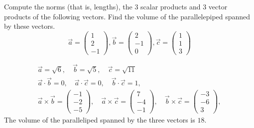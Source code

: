 \documentclass[11pt]{article}
\begin{document}


\begin{exercise}
	Compute the norms (that is, lengths), the $3$ scalar products and $3$ vector products of the following vectors. 
    Find the volume of the parallelepiped spanned by these vectors.
    \[
    \vec{a} = \left(\begin{array}{c} 1 \\ 2 \\ -1 \end{array}\right)
    ,
    \vec{b} = \left(\begin{array}{c} 2 \\ -1 \\ 0 \end{array}\right)
    ,
    \vec{c} = \left(\begin{array}{c} 1 \\ 1 \\ 3 \end{array}\right)
    \]
\end{exercise}

\begin{solution}
    \begin{gather*}
        \vec{a} = \sqrt{6}, \quad \vec{b} = \sqrt{5}, \quad \vec{c} = \sqrt{11}
        \\
        \vec{a} \cdot \vec{b} = 0,
        \quad 
        \vec{a} \cdot \vec{c} = 0,
        \quad 
        \vec{b} \cdot \vec{c} = 1,
        \\ 
        \vec{a} \times \vec{b} = \left(\begin{array}{c} -1 \\ -2 \\ -5 \end{array}\right),
        \quad 
        \vec{a} \times \vec{c} = \left(\begin{array}{c} 7 \\ -4 \\ -1 \end{array}\right),
        \quad 
        \vec{b} \times \vec{c} = \left(\begin{array}{c} -3 \\ -6 \\ 3 \end{array}\right),
    \end{gather*}
    The volume of the paralleliped spanned by the three vectors is $18$.
    
    
\end{solution}
\end{document}
